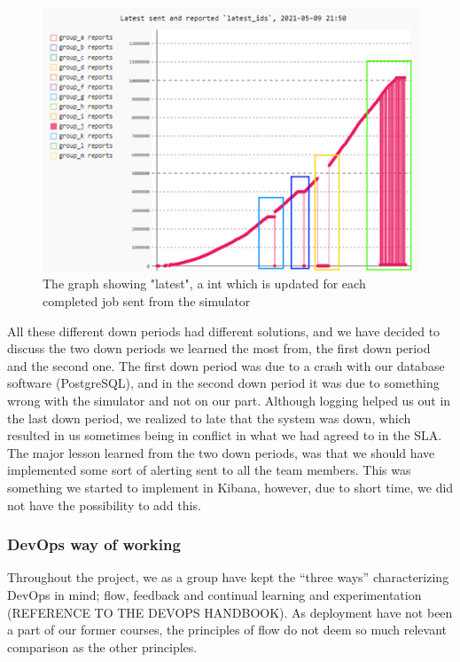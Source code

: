 \begin{figure}[h!]
    \centering
    \includegraphics[scale=0.7]{images/downperiodes.png}
    \caption{The graph showing "latest", a int which is updated for each completed job sent from the simulator }
\end{figure}
 
All these different down periods had different solutions, and we have decided to discuss the two down periods we learned the most from, the first down period and the second one. The first down period was due to a crash with our database software (PostgreSQL), and in the second down period it was due to something wrong with the simulator and not on our part. Although logging helped us out in the last down period, we realized to late that the system was down, which resulted in us sometimes being in conflict in what we had agreed to in the SLA. The major lesson learned from the two down periods, was that we should have implemented some sort of alerting sent to all the team members. This was something we started to implement in Kibana, however, due to short time, we did not have the possibility to add this.

\subsubsection{DevOps way of working}

Throughout the project, we as a group have kept the “three ways” characterizing DevOps in mind; flow, feedback and continual learning and experimentation (REFERENCE TO THE DEVOPS HANDBOOK). As deployment have not been a part of our former courses, the principles of flow do not deem so much relevant comparison as the other principles.

